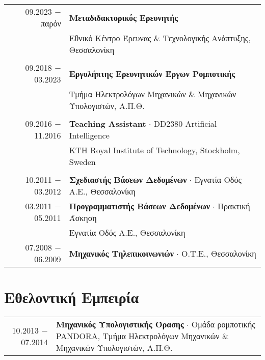 \documentclass[a4paper,10pt,twoside]{article}
\begin{document}
\begin{tabular}{rp{12cm}}
09.2023  $-$ \hfill παρόν \hfill  & \textbf{Μεταδιδακτορικός Ερευνητής} \\
                    & Εθνικό Κέντρο Έρευνας \& Τεχνολογικής Ανάπτυξης, Θεσσαλονίκη \\
&\\
09.2018 $-$ 03.2023 & \textbf{Εργολήπτης Ερευνητικών Έργων Ρομποτικής} \\
                    & Τμήμα Ηλεκτρολόγων Μηχανικών \& Μηχανικών Υπολογιστών, Α.Π.Θ.\\
&\\
09.2016 $-$ 11.2016 & \textbf{Teaching Assistant} $\cdot$ DD2380 Artificial Intelligence \\ & KTH Royal Institute of Technology, Stockholm, Sweden\\
&\\
10.2011 $-$ 03.2012 & \textbf{Σχεδιαστής Βάσεων Δεδομένων} $\cdot$ Εγνατία Οδός Α.Ε., Θεσσαλονίκη \\
03.2011 $-$ 05.2011 & \textbf{Προγραμματιστής Βάσεων Δεδομένων} $\cdot$ Πρακτική Άσκηση \\ & Εγνατία Οδός Α.Ε., Θεσσαλονίκη \\
07.2008 $-$ 06.2009 & \textbf{Μηχανικός Τηλεπικοινωνιών} $\cdot$ Ο.Τ.Ε., Θεσσαλονίκη
\end{tabular}



\section{Εθελοντική Εμπειρία}
\begin{tabular}{rp{12cm}}
10.2013 $-$ 07.2014 & \textbf{Μηχανικός Υπολογιστικής Όρασης} $\cdot$ Ομάδα ρομποτικής PANDORA, Τμήμα Ηλεκτρολόγων Μηχανικών \& Μηχανικών Υπολογιστών, Α.Π.Θ.
\end{tabular}

\end{document}
